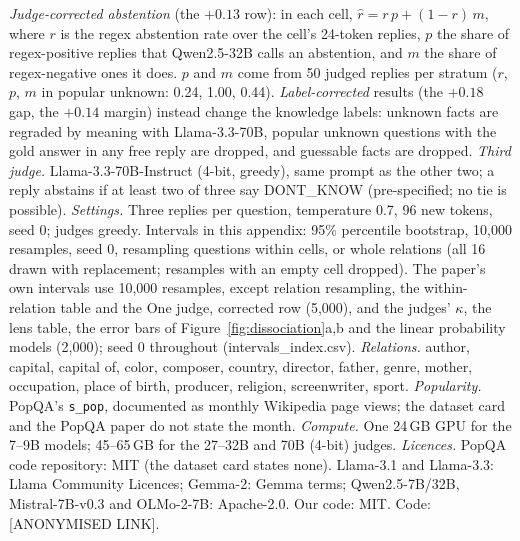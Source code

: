 \emph{Judge-corrected abstention} (the $+0.13$ row): in each cell, $\hat r = r\,p + (1-r)\,m$, where $r$ is the regex abstention rate over the cell's 24-token replies, $p$ the share of regex-positive replies that Qwen2.5-32B calls an abstention, and $m$ the share of regex-negative ones it does. $p$ and $m$ come from 50 judged replies per stratum ($r$, $p$, $m$ in popular unknown: 0.24, 1.00, 0.44). \emph{Label-corrected} results (the $+0.18$ gap, the $+0.14$ margin) instead change the knowledge labels: unknown facts are regraded by meaning with Llama-3.3-70B, popular unknown questions with the gold answer in any free reply are dropped, and guessable facts are dropped.
\emph{Third judge.} Llama-3.3-70B-Instruct (4-bit, greedy), same prompt as the other two; a reply abstains if at least two of three say DONT\_KNOW (pre-specified; no tie is possible).
\emph{Settings.} Three replies per question, temperature 0.7, 96 new tokens, seed 0; judges greedy. Intervals in this appendix: 95\% percentile bootstrap, 10,000 resamples, seed 0, resampling questions within cells, or whole relations (all 16 drawn with replacement; resamples with an empty cell dropped). The paper's own intervals use 10,000 resamples, except relation resampling, the within-relation table and the One judge, corrected row (5,000), and the judges' $\kappa$, the lens table, the error bars of Figure~\ref{fig:dissociation}a,b and the linear probability models (2,000); seed 0 throughout (intervals\_index.csv).
\emph{Relations.} author, capital, capital of, color, composer, country, director, father, genre, mother, occupation, place of birth, producer, religion, screenwriter, sport.
\emph{Popularity.} PopQA's \texttt{s\_pop}, documented as monthly Wikipedia page views; the dataset card and the PopQA paper do not state the month.
\emph{Compute.} One 24\,GB GPU for the 7--9B models; 45--65\,GB for the 27--32B and 70B (4-bit) judges.
\emph{Licences.} PopQA code repository: MIT (the dataset card states none). Llama-3.1 and Llama-3.3: Llama Community Licences; Gemma-2: Gemma terms; Qwen2.5-7B/32B, Mistral-7B-v0.3 and OLMo-2-7B: Apache-2.0. Our code: MIT. Code: [ANONYMISED LINK].

